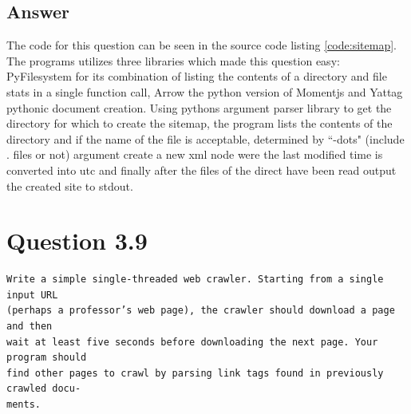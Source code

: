 \documentclass[11pt]{article}
\newenvironment{code}{\captionsetup{type=listing}}{}
\begin{document}
\subsection{Answer}
\setcounter{listing}{0}
The code for this question can be seen in the source code listing \hyperref[code:sitemap]{\ref{code:sitemap}}. The programs utilizes three libraries which made this question easy: PyFilesystem \cite{pyfs} for its combination of listing the contents of a directory and file stats in a single function call, Arrow \cite{arrow} the python version of Momentjs and Yattag\cite{yattag} pythonic document creation. Using pythons argument parser library to get the directory for which to create the sitemap, the program lists the contents of the directory and if the name of the file is acceptable, determined by ``-dots" (include . files or not) argument create a new xml node were the last modified time is converted into utc and finally after the files of the direct have been read output the created site to stdout. 

\begin{code}
	 \label{code:sitemap}
\end{code}
\newpage
\clearpage
\section{Question 3.9}
\begin{verbatim}
Write a simple single-threaded web crawler. Starting from a single input URL
(perhaps a professor’s web page), the crawler should download a page and then
wait at least five seconds before downloading the next page. Your program should
find other pages to crawl by parsing link tags found in previously crawled docu-
ments.
\end{verbatim}
\end{document}
